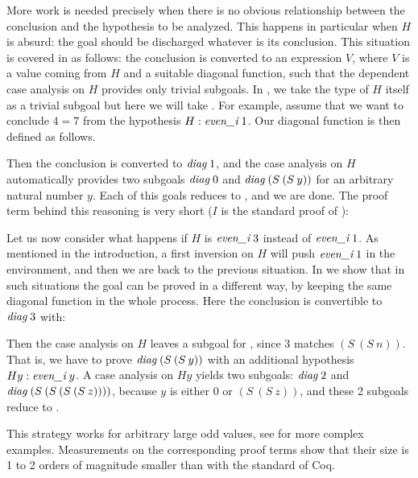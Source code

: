 More work is needed precisely when there is no obvious relationship
between the conclusion and the hypothesis to be analyzed.
This happens in particular when $H$ is absurd:
the goal should be discharged whatever is its conclusion.
This situation is covered in \cite{small_inv} as follows:
the conclusion is converted 
to an expression \diag $V$,
where $V$ is a value coming from $H$ 
and \diag a suitable diagonal function, such that
the dependent case analysis on $H$ provides only trivial subgoals.
In \cite{small_inv}, we take the type of $H$ itself as a trivial
subgoal but here we will take \True.
For example, assume that we want to conclude
$4=7$ from the hypothesis $H: \textit{even\_i}\;1$.
Our diagonal function is then defined as follows.


\vspace*{-.7\baselineskip}
\noindent
Then the conclusion is converted to $\textit{diag}\;1$,
and the case analysis on $H$ 
automatically provides two subgoals $\textit{diag}\;0$
and $\textit{diag}\;(S\: (S\:y))$ for an arbitrary natural number $y$.
Each of this goals reduces to \True, 
and we are done.
The proof term behind this reasoning is very short
($I$ is the standard proof of \True):


\vspace*{-.7\baselineskip}
Let us now consider what happens if $H$ is 
$\textit{even\_i}\;3$ instead of $\textit{even\_i}\;1$. 
As mentioned in the introduction, 
a first inversion on $H$ will push $\textit{even\_i}\;1$ in the environment, 
and then we are back to the previous situation.
In \cite{small_inv} we show that in such situations 
the goal can be proved in a different way, by keeping
the same diagonal function in the whole process.
Here the conclusion is convertible to $\textit{diag}\;3$ with:


\vspace*{-.7\baselineskip}
\noindent
Then the case analysis on $H$ leaves a subgoal for \ET,
since 3 matches $(S\: (S\:n))$.
That is, we have to prove 
$\textit{diag}\;(S\: (S\:y))$ with an additional hypothesis $Hy: \textit{even\_i}\;y$.
A case analysis on $Hy$ yields two subgoals:
$\textit{diag}\;2$ and $\textit{diag}\;(S\: (S\: (S\: (S\:z))))$,
because $y$ is either $0$ or $(S\: (S\:z))$, and
these 2 subgoals reduce to \True.

This strategy works for arbitrary large odd values,
see \cite{small_inv} for more complex examples.
Measurements on the corresponding proof terms show
that their size is 1 to 2 orders of magnitude smaller
than with the standard \inversion of Coq.




